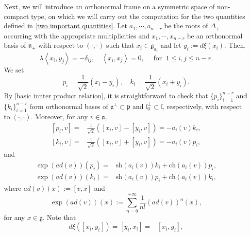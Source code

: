 \documentclass[12pt]{amsart}
\begin{document}
Next, we will introduce an orthonormal frame on a symmetric space of non-compact type, on which we will carry out the computation for the two quantities defined in \eqref{two important quantities}. Let $a_{1},\cdots, a_{n-r}$ be the roots of $\Delta_{+}$ occurring with the appropriate multiplicities and $x_{1},\cdots,x_{n-r}$ be an orthonormal basis of $\mathfrak{n}_{+}$ with respect to $(\cdot, \cdot)$ such that $x_{i} \in \mathfrak{g}_{a_{i}}$ and let $y_i := d\xi(x_i)$. Then, 
\begin{equation}\label{basic innter product relation}
\lambda\left\langle x_i, y_j\right\rangle=-\delta_{i j}, \quad\left\langle x_i, x_j\right\rangle=0,\quad\text{ for  }\; 1\leq i, j \leq n -r . 
\end{equation}
We set
\begin{equation}
    p_{i}=\frac{1}{\sqrt{2}}(x_{i}-y_{i}),\quad k_{i}=\frac{1}{\sqrt{2}}(x_{i} +y_{i}). 
\end{equation}
By \eqref{basic innter product relation}, it is straightforward to check that $\{p_i\}_{i=1}^{n-r}$ and $\{k_i\}_{i=1}^{n-r}$ form orthonormal bases of $\mathfrak{a}^{\perp}\subset\mathfrak{p}$ and $\mathfrak{l}_0^{\perp}\subset\mathfrak{l}$, respectively, with respect to $(\cdot,\cdot)$. Moreover, for any $v\in \mathfrak{a}$,
\begin{equation}\label{basic frame relation}
    \begin{split}
        [p_i,v] =& \frac{1}{\sqrt{2}}([x_i,v]-[y_i,v]) = -a_i(v) k_i,\\
        [k_i,v] =& \frac{1}{\sqrt{2}}([x_i,v]+[y_i,v]) = -a_i(v) p_i,
    \end{split}
\end{equation}
and 
\begin{equation}\label{sinh existence}
    \begin{split}
        \exp(ad(v))(p_i) =& \mathrm{sh}(a_i(v))k_i + \mathrm{ch}(a_i(v)) p_i,\\
        \exp(ad(v))(k_i) =& \mathrm{sh}(a_i(v))p_i + \mathrm{ch}(a_i(v)) k_i,
    \end{split}
\end{equation}
where $ad(v)(x) := [v, x]$ and 
\begin{equation}\label{adjoint action}
    \exp(ad(v))(x) := \sum_{n = 0}^{+\infty}\frac{1}{n!}(ad(v))^n(x),
\end{equation}
for any $x\in \mathfrak{g}$. Note that 
\begin{equation*}
    d\xi([x_{i}, y_{i}]) = [y_{i}, x_{i}] = -[x_{i}, y_{i}],
\end{equation*}
\end{document}
